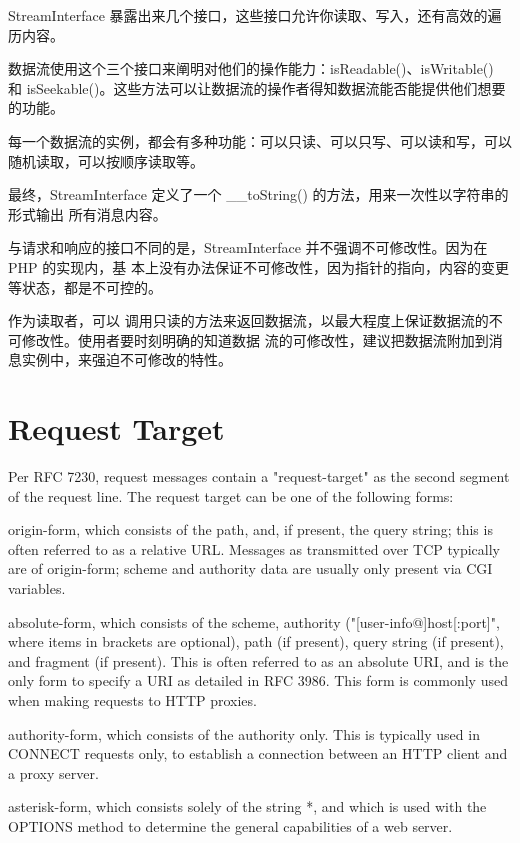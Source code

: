 StreamInterface 暴露出来几个接口，这些接口允许你读取、写入，还有高效的遍历内容。

数据流使用这个三个接口来阐明对他们的操作能力：isReadable()、isWritable() 和 isSeekable()。这些方法可以让数据流的操作者得知数据流能否能提供他们想要的功能。

每一个数据流的实例，都会有多种功能：可以只读、可以只写、可以读和写，可以随机读取，可以按顺序读取等。

最终，StreamInterface 定义了一个 \_\_toString() 的方法，用来一次性以字符串的形式输出 所有消息内容。

与请求和响应的接口不同的是，StreamInterface 并不强调不可修改性。因为在 PHP 的实现内，基 本上没有办法保证不可修改性，因为指针的指向，内容的变更等状态，都是不可控的。

作为读取者，可以 调用只读的方法来返回数据流，以最大程度上保证数据流的不可修改性。使用者要时刻明确的知道数据 流的可修改性，建议把数据流附加到消息实例中，来强迫不可修改的特性。

\section{Request Target}


Per RFC 7230, request messages contain a "request-target" as the second segment of the request line. The request target can be one of the following forms:

\begin{compactitem}
\item origin-form, which consists of the path, and, if present, the query string; this is often referred to as a relative URL. Messages as transmitted over TCP typically are of origin-form; scheme and authority data are usually only present via CGI variables.
\item absolute-form, which consists of the scheme, authority ("[user-info@]host[:port]", where items in brackets are optional), path (if present), query string (if present), and fragment (if present). This is often referred to as an absolute URI, and is the only form to specify a URI as detailed in RFC 3986. This form is commonly used when making requests to HTTP proxies.
\item authority-form, which consists of the authority only. This is typically used in CONNECT requests only, to establish a connection between an HTTP client and a proxy server.
\item asterisk-form, which consists solely of the string *, and which is used with the OPTIONS method to determine the general capabilities of a web server.
\end{compactitem}

